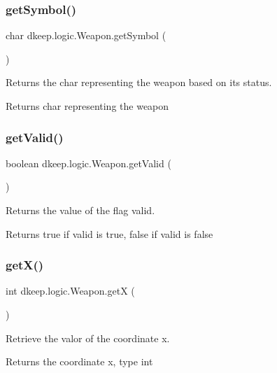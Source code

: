 \subsubsection{\texorpdfstring{get\+Symbol()}{getSymbol()}}
{\footnotesize\ttfamily char dkeep.\+logic.\+Weapon.\+get\+Symbol (\begin{DoxyParamCaption}{ }\end{DoxyParamCaption})}

Returns the char representing the weapon based on it\textquotesingle{}s status. \begin{DoxyReturn}{Returns}
char representing the weapon 
\end{DoxyReturn}
\mbox{\label{classdkeep_1_1logic_1_1_weapon_a68d3c9c406b56366ccfd75cae899bb68}} 
\subsubsection{\texorpdfstring{get\+Valid()}{getValid()}}
{\footnotesize\ttfamily boolean dkeep.\+logic.\+Weapon.\+get\+Valid (\begin{DoxyParamCaption}{ }\end{DoxyParamCaption})}

Returns the value of the flag valid. \begin{DoxyReturn}{Returns}
true if valid is true, false if valid is false 
\end{DoxyReturn}
\mbox{\label{classdkeep_1_1logic_1_1_weapon_a91b3f16c06cb271d31f1aa013c45ce31}} 
\subsubsection{\texorpdfstring{get\+X()}{getX()}}
{\footnotesize\ttfamily int dkeep.\+logic.\+Weapon.\+getX (\begin{DoxyParamCaption}{ }\end{DoxyParamCaption})}

Retrieve the valor of the coordinate x. \begin{DoxyReturn}{Returns}
the coordinate x, type int 
\end{DoxyReturn}
\mbox{\label{classdkeep_1_1logic_1_1_weapon_a5e47ccc0670cc36854af2dd1f72a70ee}} 
